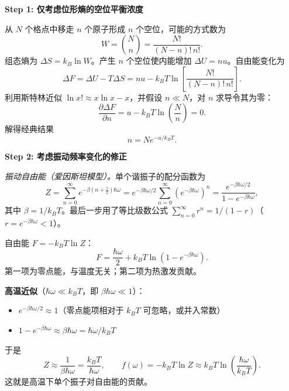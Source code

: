 \begin{derivationbox}[标准解题过程]
\textbf{Step 1: 仅考虑位形熵的空位平衡浓度}

从 $N$ 个格点中移走 $n$ 个原子形成 $n$ 个空位，可能的方式数为
\begin{equation}
W = \binom{N}{n} = \frac{N!}{(N-n)!\,n!}.
\end{equation}
组态熵为 $\Delta S = k_{\!B}\ln W$。产生 $n$ 个空位使内能增加 $\Delta U = nu$。自由能变化为
\begin{equation}
\Delta F = \Delta U - T\Delta S = nu - k_{\!B}T\ln\!\left[\frac{N!}{(N-n)!\,n!}\right].
\end{equation}
利用斯特林近似 $\ln x! \approx x\ln x - x$，并假设 $n\ll N$，对 $n$ 求导令其为零：
\begin{equation}
\frac{\partial\Delta F}{\partial n} = u - k_{\!B}T\ln\!\left(\frac{N}{n}\right) = 0.
\end{equation}
解得经典结果
\begin{equation}
\boxed{n = N e^{-u/k_{\!B}T}.}
\label{eq:vacancy-classical}
\end{equation}

\textbf{Step 2: 考虑振动频率变化的修正}

\textit{振动自由能（爱因斯坦模型）。}单个谐振子的配分函数为
\begin{equation}
Z = \sum_{n=0}^{\infty} e^{-\beta(n+\frac{1}{2})\hbar\omega}
= e^{-\beta\hbar\omega/2}\sum_{n=0}^{\infty}\left(e^{-\beta\hbar\omega}\right)^{n}
= \frac{e^{-\beta\hbar\omega/2}}{1-e^{-\beta\hbar\omega}},
\end{equation}
其中 $\beta=1/k_{\!B}T$。最后一步用了等比级数公式 $\sum_{n=0}^{\infty}r^{n}=1/(1-r)$（$r=e^{-\beta\hbar\omega}<1$）。

自由能 $F=-k_{\!B}T\ln Z$：
\begin{equation}
F = \frac{\hbar\omega}{2} + k_{\!B}T\ln\!\left(1-e^{-\beta\hbar\omega}\right).
\end{equation}
第一项为零点能，与温度无关；第二项为热激发贡献。

\textbf{高温近似}（$\hbar\omega\ll k_{\!B}T$，即 $\beta\hbar\omega\ll 1$）：
\begin{itemize}
    \item $e^{-\beta\hbar\omega/2}\approx 1$（零点能项相对于 $k_{\!B}T$ 可忽略，或并入常数）
    \item $1-e^{-\beta\hbar\omega}\approx \beta\hbar\omega = \hbar\omega/k_{\!B}T$
\end{itemize}
于是
\begin{equation}
Z \approx \frac{1}{\beta\hbar\omega} = \frac{k_{\!B}T}{\hbar\omega},
\qquad
f(\omega) = -k_{\!B}T\ln Z \approx k_{\!B}T\ln\!\left(\frac{\hbar\omega}{k_{\!B}T}\right).
\end{equation}
这就是高温下单个振子对自由能的贡献。


\end{derivationbox}
